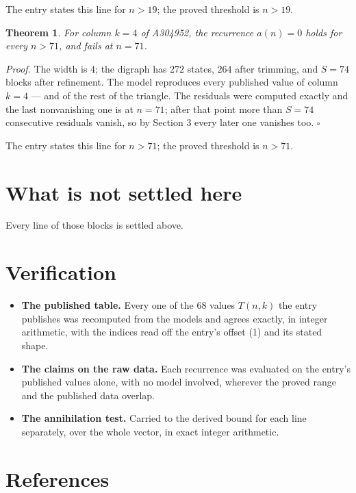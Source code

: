 \documentclass[11pt]{article}
\newtheorem{theorem}{Theorem}
\theoremstyle{definition}
\begin{document}
The entry states this line for $n > 19$; the proved threshold is $n > 19$.

\begin{theorem} For column $k = 4$ of A304952, the recurrence $a(n) = 0$ holds for every $n > 71$, and fails at $n = 71$.\end{theorem}

{\itshape Proof.} The width is $4$; the digraph has $272$ states, $264$ after trimming, and $S = 74$ blocks after refinement. The model reproduces every published value of column $k = 4$ --- and of the rest of the triangle. The residuals were computed exactly and the last nonvanishing one is at $n = 71$; after that point more than $S = 74$ consecutive residuals vanish, so by Section 3 every later one vanishes too. $\square$

The entry states this line for $n > 71$; the proved threshold is $n > 71$.

\section{What is not settled here}

Every line of those blocks is settled above.

\section{Verification}

\begin{itemize}

\item {\bfseries The published table.} Every one of the 68 values $T(n,k)$ the entry publishes was recomputed from the models and agrees exactly, in integer arithmetic, with the indices read off the entry's offset (1) and its stated shape.

\item {\bfseries The claims on the raw data.} Each recurrence was evaluated on the entry's published values alone, with no model involved, wherever the proved range and the published data overlap.

\item {\bfseries The annihilation test.} Carried to the derived bound for each line separately, over the whole vector, in exact integer arithmetic.

\end{itemize}

\section{References}
\end{document}
